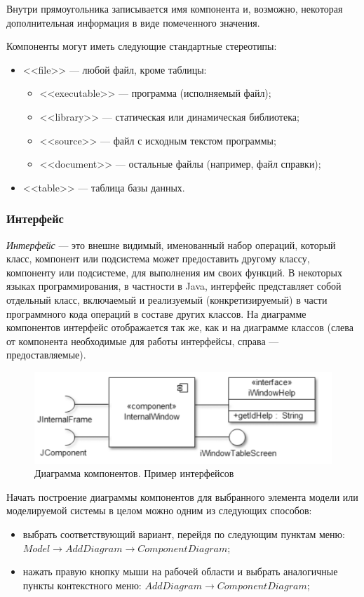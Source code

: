 \documentclass[a4paper,12pt]{extreport}
\begin{document}
Внутри прямоугольника записывается имя компонента и, возможно, некоторая дополнительная информация в виде помеченного значения.

Компоненты могут иметь следующие стандартные стереотипы:
\begin{itemize}
	 \item <<file>> --- любой файл, кроме таблицы:
	 \begin{itemize}
	 	\item <<executable>> --- программа (исполняемый файл);
	 	\item <<library>> --- статическая или динамическая библиотека;
	 	\item <<source>> --- файл с исходным текстом программы;
	 	\item <<document>> --- остальные файлы (например, файл справки);
	 	
	 \end{itemize}
	
	\item  <<table>> --- таблица базы данных.
\end{itemize}
\subsubsection*{Интерфейс}
\textit{Интерфейс} --- это внешне видимый, именованный набор операций, который класс, компонент или подсистема может предоставить другому классу, компоненту или подсистеме, для выполнения им своих функций. В некоторых языках программирования, в частности в Java, интерфейс представляет собой отдельный класс, включаемый и реализуемый (конкретизируемый) в части программного кода операций в составе других классов. На диаграмме компонентов интерфейс отображается так же, как и на диаграмме классов (слева от компонента необходимые для работы интерфейсы, справа --- предоставляемые).
\begin{figure}[h!]
	\centering
	\includegraphics[width=0.6\linewidth]{images/componentsinterface}
	\caption{Диаграмма компонентов. Пример интерфейсов}
	\label{fig:componentsinterface}
\end{figure}



Начать построение диаграммы компонентов для выбранного элемента модели или моделируемой системы в целом можно одним из следующих способов:
\begin{itemize}
	\item выбрать соответствующий вариант, перейдя по следующим пунктам меню: \\$Model \to Add Diagram \to Component Diagram$;
	\item нажать правую кнопку мыши на рабочей области и выбрать аналогичные пункты контекстного меню: $Add Diagram \to Component Diagram$;
\end{itemize}
\end{document}
